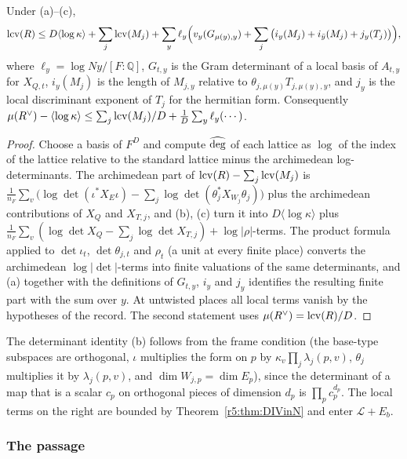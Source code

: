 \begin{proposition}\label{w3:W3:base}
Under (a)--(c),
\[
\operatorname{lcv}(R)\le D\langle\log\kappa\rangle+\sum_j\operatorname{lcv}(M_j)+\sum_y\ell_y\Big(v_y(G_{\mu(y),y})+\sum_j\big(i_y(M_j)+i_{\bar y}(M_j)+j_y(T_j)\big)\Big),
\]
where $\ell_y=\log Ny/[F:\mathbb Q]$, $G_{t,y}$ is the Gram determinant of a local basis of $A_{t,y}$ for $X_{Q,t}$, $i_y(M_j)$ is the length of $M_{j,y}$ relative to $\theta_{j,\mu(y)}T_{j,\mu(y),y}$, and $j_y$ is the local discriminant exponent of $T_j$ for the hermitian form. Consequently $\mu(R^\vee)-\langle\log\kappa\rangle\le\sum_j\operatorname{lcv}(M_j)/D+\frac1D\sum_y\ell_y(\cdots)$.
\end{proposition}

\begin{proof}
Choose a basis of $F^D$ and compute $\widehat{\deg}$ of each lattice as $\log$ of the index of the lattice relative to the standard lattice minus the archimedean log-determinants. The archimedean part of $\operatorname{lcv}(R)-\sum_j\operatorname{lcv}(M_j)$ is $\frac1{n_F}\sum_v\big(\log\det(\iota^*X_E\iota)-\sum_j\log\det(\theta_j^*X_{W_j}\theta_j)\big)$ plus the archimedean contributions of $X_{Q}$ and $X_{T,j}$, and (b), (c) turn it into $D\langle\log\kappa\rangle$ plus $\frac1{n_F}\sum_v(\log\det X_Q-\sum_j\log\det X_{T,j})+\log\lvert\rho\rvert$-terms. The product formula applied to $\det\iota_t$, $\det\theta_{j,t}$ and $\rho_t$ (a unit at every finite place) converts the archimedean $\log\lvert\det\rvert$-terms into finite valuations of the same determinants, and (a) together with the definitions of $G_{t,y}$, $i_y$ and $j_y$ identifies the resulting finite part with the sum over $y$. At untwisted places all local terms vanish by the hypotheses of the record. The second statement uses $\mu(R^\vee)=\operatorname{lcv}(R)/D$.
\end{proof}

The determinant identity (b) follows from the frame condition (the base-type subspaces are orthogonal, $\iota$ multiplies the form on $p$ by $\kappa_v\prod_j\lambda_j(p,v)$, $\theta_j$ multiplies it by $\lambda_j(p,v)$, and $\dim W_{j,p}=\dim E_p$), since the determinant of a map that is a scalar $c_p$ on orthogonal pieces of dimension $d_p$ is $\prod_pc_p^{d_p}$. The local terms on the right are bounded by Theorem~\ref{r5:thm:DIVinN} and enter $\mathcal L+E_b$.

\subsubsection{The passage}

